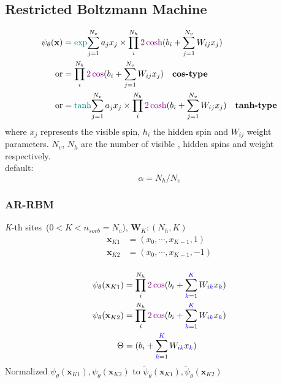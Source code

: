 \subsection{Restricted Boltzmann Machine}
\begin{equation}
    \begin{split}
    \psi_{\theta}(\mathbf{x}) & = \textcolor{teal}{\exp}{\sum_{j=1}^{N_v}a_jx_j} \times 
        \prod_i^{N_h}\textcolor{violet}{2\cosh}(b_i + \sum_{j=1}^{N_v}W_{ij}x_j) \\
        \text{or} & = \prod_i^{N_h}\textcolor{violet}{2\cos}(b_i + \sum_{j=1}^{N_v}W_{ij}x_j) \quad 
        \textbf{cos-type}\\
        \text{or} & = \textcolor{teal}{\tanh}{\sum_{j=1}^{N_v}a_jx_j} \times 
        \prod_i^{N_h}\textcolor{violet}{2\cosh}(b_i + \sum_{j=1}^{N_v}W_{ij}x_j) \quad
        \textbf{tanh-type}
    \end{split}
\end{equation}
where $x_j$ represents the visible spin, $h_i$ the hidden spin and $W_{ij}$ weight parameters.
$N_v$, $N_h$ are the number of visible , hidden spins and weight respectively.\\
default:
\begin{equation}
    \alpha = N_h/N_v
\end{equation}

\subsubsection{AR-RBM}
\textit{K}-th sites\ ($0 < K < n_{sorb}=N_v$), $\mathbf{W}_K : (N_h, K)$\cite{bortone2023impact}
\begin{equation}
    \begin{split}
    \mathbf{x}_{K1} & = (x_0, \cdots, x_{K-1}, 1) \\
    \mathbf{x}_{K2} & = (x_0, \cdots, x_{K-1}, -1) \\
    \end{split}
\end{equation}

\begin{equation}
    \begin{split}
    \psi_{\theta}(\mathbf{x}_{K1}) & = \prod_{i}^{N_h}\textcolor{violet}{2\cos}
    (b_i + \sum_{\textcolor{blue}{k}=1}^{\textcolor{blue}{K}}W_{i\textcolor{blue}{k}}x_{\textcolor{blue}{k}}) \\
    \psi_{\theta}(\mathbf{x}_{K2}) & = \prod_{i}^{N_h}\textcolor{violet}{2\cos}
    (b_i + \sum_{\textcolor{blue}{k}=1}^{\textcolor{blue}{K}}W_{i\textcolor{blue}{k}}x_{\textcolor{blue}{k}}) \\
    \Theta & = (b_i + \sum_{\textcolor{blue}{k}=1}^{\textcolor{blue}{K}}W_{i\textcolor{blue}{k}}x_{\textcolor{blue}{k}})
    \end{split}
\end{equation}
Normalized $\psi_{\theta}(\mathbf{x}_{K1}), \psi_{\theta}(\mathbf{x}_{K2})$
to $\widetilde{\psi}_{\theta}(\mathbf{x}_{K1}), \widetilde{\psi}_{\theta}(\mathbf{x}_{K2})$

